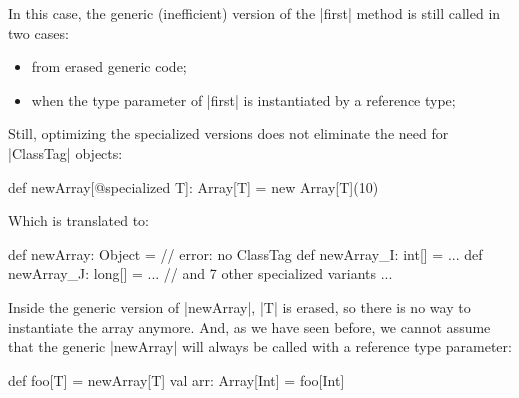 In this case, the generic (inefficient) version of the |first| method is still called in two cases:
\begin{itemize}
  \item from erased generic code;
  \item when the type parameter of |first| is instantiated by a reference type;
\end{itemize}


Still, optimizing the specialized versions does not eliminate the need for |ClassTag| objects:

\begin{lstlisting-nobreak}
 def newArray[@specialized T]: Array[T] =
   new Array[T](10)
\end{lstlisting-nobreak}

Which is translated to:

\begin{lstlisting-nobreak}
 def newArray: Object = // error: no ClassTag
 def newArray_I: int[] = ...
 def newArray_J: long[] = ...
 // and 7 other specialized variants ...
\end{lstlisting-nobreak}

Inside the generic version of |newArray|, |T| is erased, so there is no way to instantiate the array anymore. And, as we have seen before, we cannot assume that the generic |newArray| will always be called with a reference type parameter:

\begin{lstlisting-nobreak}
 def foo[T] = newArray[T]
 val arr: Array[Int] = foo[Int]
\end{lstlisting-nobreak}

